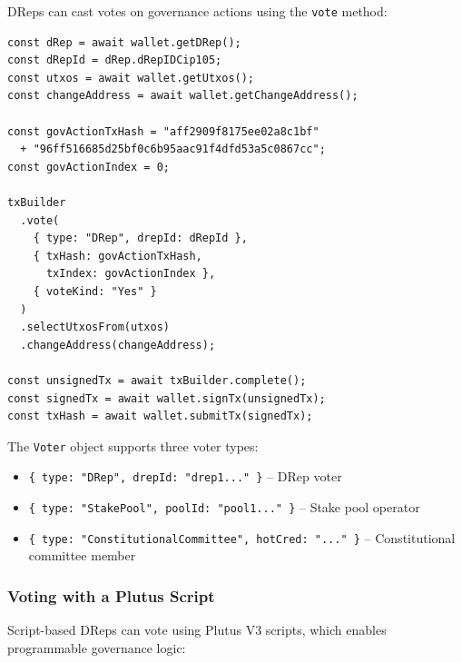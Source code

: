 DReps can cast votes on governance actions using the \texttt{vote} method:

\begin{lstlisting}[caption=Casting a Vote on a Governance Action]
const dRep = await wallet.getDRep();
const dRepId = dRep.dRepIDCip105;
const utxos = await wallet.getUtxos();
const changeAddress = await wallet.getChangeAddress();

const govActionTxHash = "aff2909f8175ee02a8c1bf"
  + "96ff516685d25bf0c6b95aac91f4dfd53a5c0867cc";
const govActionIndex = 0;

txBuilder
  .vote(
    { type: "DRep", drepId: dRepId },
    { txHash: govActionTxHash,
      txIndex: govActionIndex },
    { voteKind: "Yes" }
  )
  .selectUtxosFrom(utxos)
  .changeAddress(changeAddress);

const unsignedTx = await txBuilder.complete();
const signedTx = await wallet.signTx(unsignedTx);
const txHash = await wallet.submitTx(signedTx);
\end{lstlisting}

The \texttt{Voter} object supports three voter types:
\begin{itemize}
    \item \texttt{\{ type: "DRep", drepId: "drep1..." \}} -- DRep voter
    \item \texttt{\{ type: "StakePool", poolId: "pool1..." \}} -- Stake pool operator
    \item \texttt{\{ type: "ConstitutionalCommittee", hotCred: "..." \}} -- Constitutional committee member
\end{itemize}

\subsubsection{Voting with a Plutus Script}

Script-based DReps can vote using Plutus V3 scripts, which enables programmable governance logic:

